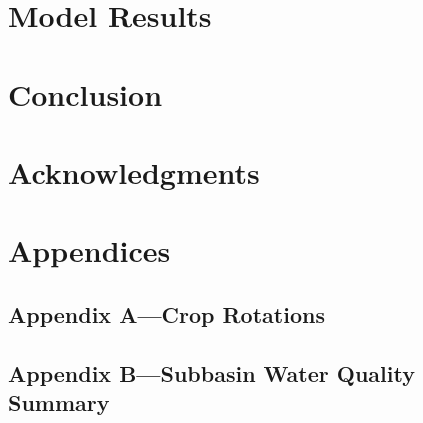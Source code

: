 \documentclass[10pt,letterpaper]{article}%
\begin{document}
\section{Model Results}
\pagebreak
\section{Conclusion}
\pagebreak
\section{Acknowledgments}
\pagebreak


\section{Appendices}
	\subsection{Appendix A---Crop Rotations}
	\subsection{Appendix B---Subbasin Water Quality Summary}
\end{document}
